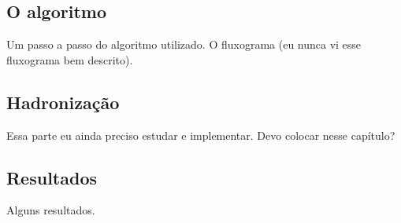 \documentclass[a4paper,12pt]{article}
\begin{document}
\subsection{O algoritmo}

Um passo a passo do algoritmo utilizado. O fluxograma (eu nunca vi esse fluxograma bem descrito).

\subsection{Hadronização}

Essa parte eu ainda preciso estudar e implementar. Devo colocar nesse capítulo?

\subsection{Resultados}

Alguns resultados.















\end{document}
